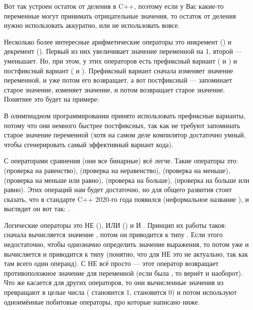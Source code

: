 \begin{itemize}
{    Вот так устроен остаток от деления в C++, поэтому если у Вас какие-то переменные могут принимать отрицательные значения, то остаток от деления нужно использовать аккуратно, или не использовать вовсе.
    
    \item Несколько более интересные арифметические операторы это инкремент (\lcpp{++}) и декремент (\lcpp{--}). Первый из них увеличивает значение переменной на 1, второй — уменьшает. Но, при этом, у этих операторов есть префиксный вариант ( и ) и постфиксный вариант ( и ). Префиксный вариант сначала изменяет значение переменной, и уже потом его возвращает, а вот постфиксный — запоминает старое значение, изменяет значение, и потом возвращает старое значение. Понятнее это будет на примере:
    
    
    В олимпиадном программировании принято использовать префиксные варианты, потому что они немного быстрее постфиксных, так как не требуют запоминать старое значение переменной (хотя на самом деле компилятор достаточно умный, чтобы сгенерировать самый эффективный вариант кода).
    
    \item С операторами сравнения (они все бинарные) всё легче. Такие операторы это:  (проверка на равенство),  (проверка на неравенство),  (проверка на меньше),  (проверка на меньше или равно),  (проверка на больше),  (проверка на больше или равно). Этих операций нам будет достаточно, но для общего развития стоит сказать, что в стандарте C++ 2020-го года появился  (неформальное название ), и выглядит он вот так: .
    
    \item Логические операторы это НЕ (), ИЛИ () и И . Принцип их работы таков: сначала вычисляется значение , потом он приводится к типу . Если этого недостаточно, чтобы однозначно определить значение выражения, то потом уже и  вычисляется и приводится к типу  (понятно, что для НЕ это не актуально, так как там всего один операнд). С НЕ всё просто — этот оператор возвращает противоположное значение для переменной (если была , то вернёт  и наоборот). Что же касается для других операторов, то они вычисленные значения из  превращают в целые числа ( становится 1,  становится 0) и потом используют одноимённые побитовые операторы, про которые написано ниже.
    
}
\end{itemize}
